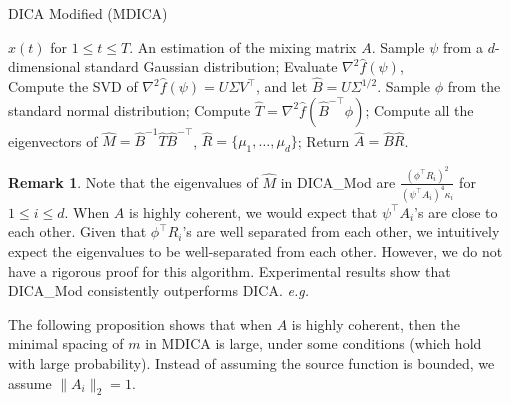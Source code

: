 \documentclass[jmlr]{article}
\newcommand{\eg}{\emph{e.g.}}
\theoremstyle{definition}
\newtheorem{remark}[lemma]{Remark}
\begin{document}
\begin{algorithm} 
\caption{DICA Modified (MDICA)}
\label{alg:DICA_Mod}
\begin{algorithmic}[1]
\INPUT $x(t)$ for $1\le t \le T$. 
\OUTPUT An estimation of the mixing matrix $A$. 
\STATE Sample $\psi$ from a $d$-dimensional standard Gaussian distribution;
\STATE Evaluate $\nabla^2\hat{f}(\psi)$, \\
\STATE Compute the SVD of $\nabla^2\hat{f}(\psi) = U \Sigma V^{\top}$, and let $\hat{B} =  U \Sigma^{1/2}$.
\STATE Sample $\phi$ from the standard normal distribution;
\STATE Compute $\hat{T} = \nabla^2 \hat{f}(\hat{B}^{-\top}\phi)$;
\STATE Compute all the eigenvectors of $\hat{M} = \hat{B}^{-1}\hat{T}\hat{B}^{-\top}$, $\hat{R} = \{\mu_1,\ldots,\mu_d\}$;
\STATE Return $\hat{A} = \hat{B}\hat{R}$.
\end{algorithmic}
\end{algorithm}
\begin{remark}
\label{rmk:DICA_Mod}
Note that the eigenvalues of $\hat{M}$ in DICA\_Mod are $\frac{(\phi^{\top}R_i)^2}{(\psi^{\top}A_i)^4\kappa_i}$ for $1\le i\le d$. 
When $A$ is highly coherent, we would expect that $\psi^{\top}A_i$'s are close to each other. 
Given that $\phi^{\top}R_i$'s are well separated from each other, we intuitively expect the eigenvalues to be well-separated from each other. 
However, we do not have a rigorous proof for this algorithm.
Experimental results show that DICA\_Mod consistently outperforms DICA. 
\eg
\end{remark}
The following proposition shows that when $A$ is highly coherent, then the  minimal spacing of $m$ in MDICA is large, under some conditions (which hold with large probability). Instead of assuming the source function is bounded, we assume $\|A_i\|_2 = 1$.
\end{document}
